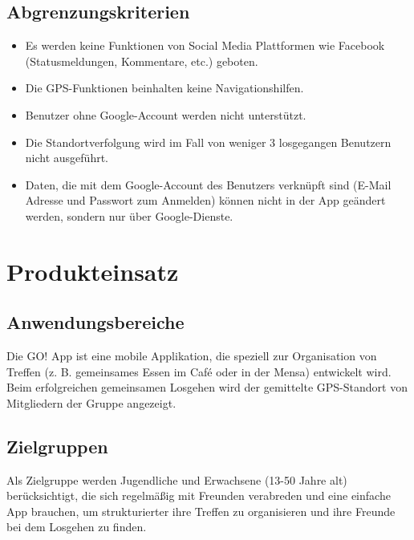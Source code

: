 \documentclass[parskip=full]{scrartcl}
\begin{document}
\subsection{Abgrenzungskriterien}
\begin{itemize}
\item Es werden keine Funktionen von Social Media Plattformen wie Facebook (Statusmeldungen, Kommentare, etc.) geboten.
\item Die GPS-Funktionen beinhalten keine Navigationshilfen.
\item Benutzer ohne Google-Account werden nicht unterstützt.
\item Die Standortverfolgung wird im Fall von weniger 3 losgegangen Benutzern nicht ausgeführt. %
\item Daten, die mit dem Google-Account des Benutzers verknüpft sind (E-Mail Adresse und Passwort zum Anmelden) können nicht in der App geändert werden, sondern nur über Google-Dienste.
\end{itemize}

\newpage
\section{Produkteinsatz}
\subsection{Anwendungsbereiche}
Die GO! App ist eine mobile Applikation, die speziell zur Organisation von Treffen (z. B. gemeinsames Essen im Café oder in der Mensa) entwickelt wird. Beim erfolgreichen gemeinsamen Losgehen wird der gemittelte GPS-Standort von Mitgliedern der Gruppe angezeigt.
 
\subsection{Zielgruppen}
Als Zielgruppe werden Jugendliche und Erwachsene (13-50 Jahre alt) berücksichtigt, die sich regelmäßig mit Freunden verabreden und eine einfache App brauchen, um strukturierter ihre Treffen zu organisieren und ihre Freunde bei dem Losgehen zu finden.
\end{document}
